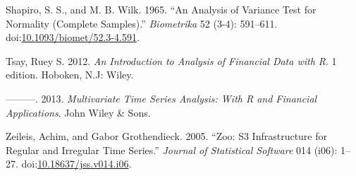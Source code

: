 \documentclass[]{article}
\begin{document}
\hypertarget{ref-shapiro_analysis_1965}{}
Shapiro, S. S., and M. B. Wilk. 1965. ``An Analysis of Variance Test for
Normality (Complete Samples).'' \emph{Biometrika} 52 (3-4): 591--611.
doi:\href{https://doi.org/10.1093/biomet/52.3-4.591}{10.1093/biomet/52.3-4.591}.

\hypertarget{ref-tsay_introduction_2012}{}
Tsay, Ruey S. 2012. \emph{An Introduction to Analysis of Financial Data
with R}. 1 edition. Hoboken, N.J: Wiley.

\hypertarget{ref-tsay_multivariate_2013}{}
---------. 2013. \emph{Multivariate Time Series Analysis: With R and
Financial Applications}. John Wiley \& Sons.

\hypertarget{ref-zeileis_zoo:_2005}{}
Zeileis, Achim, and Gabor Grothendieck. 2005. ``Zoo: S3 Infrastructure
for Regular and Irregular Time Series.'' \emph{Journal of Statistical
Software} 014 (i06): 1--27.
doi:\href{https://doi.org/10.18637/jss.v014.i06}{10.18637/jss.v014.i06}.
\end{document}
